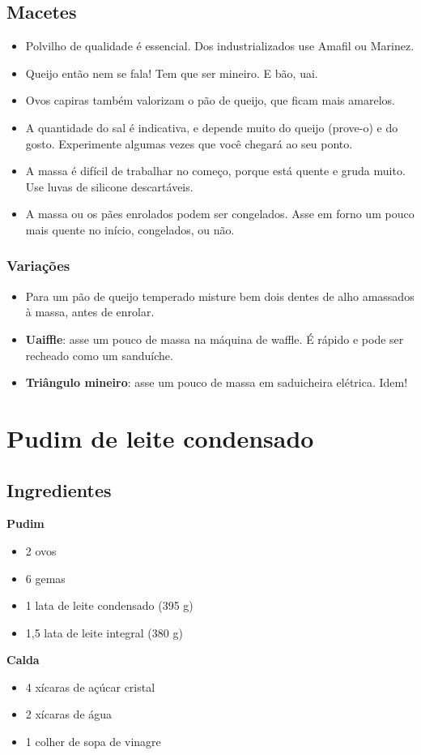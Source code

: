 \subsection*{Macetes}
\begin{itemize}
\item Polvilho de qualidade é essencial. Dos industrializados use Amafil ou Marinez.
\item Queijo então nem se fala! Tem que ser mineiro. E bão, uai.
\item Ovos capiras também valorizam o pão de queijo, que ficam mais amarelos.
\item A quantidade do sal é indicativa, e depende muito do queijo (prove-o) e do gosto. Experimente algumas vezes que você chegará ao seu ponto.
\item A massa é difícil de trabalhar no começo, porque está quente e gruda muito. Use luvas de silicone descartáveis.
\item A massa ou os pães enrolados podem ser congelados. Asse em forno um pouco mais quente no início, congelados, ou não.
\end{itemize}

\subsubsection*{Variações}
\begin{itemize}
\item Para um pão de queijo temperado misture bem dois dentes de alho amassados à massa, antes de enrolar.
\item \textbf{Uaiffle}: asse um pouco de massa na máquina de waffle. É rápido e pode ser recheado como um sanduíche.
\item \textbf{Triângulo mineiro}: asse um pouco de massa em saduicheira elétrica. Idem!
\end{itemize}

\section{Pudim de leite condensado}
\subsection{Ingredientes}
\textbf{Pudim}
\begin{itemize}
\item 2 ovos
\item 6 gemas
\item 1 lata de leite condensado (395 g)
\item 1,5 lata de leite integral (380 g)
\end{itemize}
\textbf{Calda}
\begin{itemize}
\item 4 xícaras de açúcar cristal
\item 2 xícaras de água
\item 1 colher de sopa de vinagre
\end{itemize}
